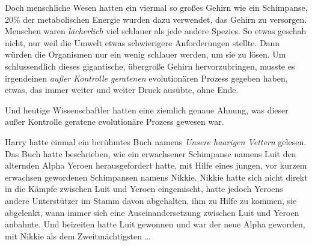Doch menschliche Wesen hatten ein viermal so großes Gehirn wie ein Schimpanse, 20\% der metabolischen Energie wurden dazu verwendet, das Gehirn zu versorgen. Menschen waren \emph{lächerlich} viel schlauer als jede andere Spezies. So etwas geschah nicht, nur weil die Umwelt etwas schwierigere Anforderungen stellte. Dann würden die Organismen nur ein wenig schlauer werden, um sie zu lösen. Um schlussendlich dieses gigantische, übergroße Gehirn hervorzubringen, musste es irgendeinen \emph{außer Kontrolle geratenen} evolutionären Prozess gegeben haben, etwas, das immer weiter und weiter Druck ausübte, ohne Ende.

Und heutige Wissenschaftler hatten eine ziemlich genaue Ahnung, was dieser außer Kontrolle geratene evolutionäre Prozess gewesen war.

Harry hatte einmal ein berühmtes Buch namens \emph{Unsere haarigen Vettern} gelesen.%
Das Buch hatte beschrieben, wie ein erwachsener Schimpanse namens Luit den alternden Alpha Yeroen herausgefordert hatte, mit Hilfe eines jungen, vor kurzem erwachsen gewordenen Schimpansen namens Nikkie. Nikkie hatte sich nicht direkt in die Kämpfe zwischen Luit und Yeroen eingemischt, hatte jedoch Yeroens andere Unterstützer im Stamm davon abgehalten, ihm zu Hilfe zu kommen, sie abgelenkt, wann immer sich eine Auseinandersetzung zwischen Luit und Yeroen anbahnte. Und beizeiten hatte Luit gewonnen und war der neue Alpha geworden, mit Nikkie als dem Zweitmächtigsten …

